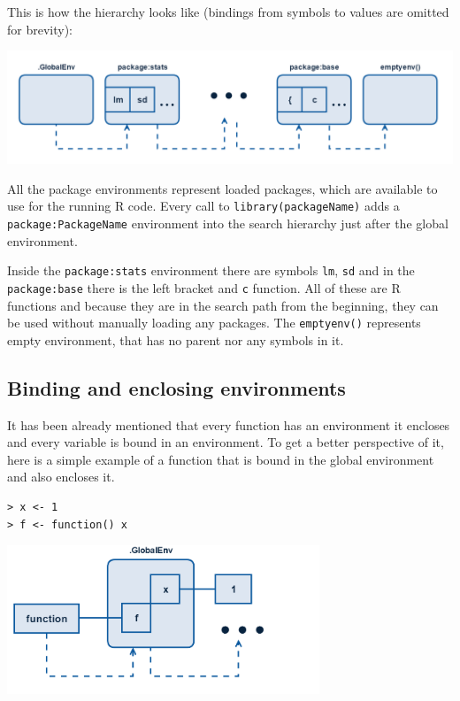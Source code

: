 \documentclass[thesis=B,english]{FITthesis}[2012/10/20]
\begin{document}
This is how the hierarchy looks like (bindings from symbols to values are omitted for brevity):

\includegraphics[width=\textwidth]{img/search-path.png}

All the package environments represent loaded packages, which are available to use for the running R code. Every call to \verb|library(packageName)| adds a \verb|package:PackageName| environment into the search hierarchy just after the global environment.

Inside the \verb|package:stats| environment there are symbols \verb|lm|, \verb|sd| and in the \verb|package:base| there is the left bracket and \verb|c| function. All of these are R functions and because they are in the search path from the beginning, they can be used without manually loading any packages. The \verb|emptyenv()| represents empty environment, that has no parent nor any symbols in it.

\subsection{Binding and enclosing environments}
It has been already mentioned that every function has an environment it encloses and every variable is bound in an environment. To get a better perspective of it, here is a simple example of a function that is bound in the global environment and also encloses it.

\begin{verbatim}
> x <- 1
> f <- function() x
\end{verbatim}

\includegraphics[width=0.7\textwidth]{img/enclosing-binding.png}
\end{document}
